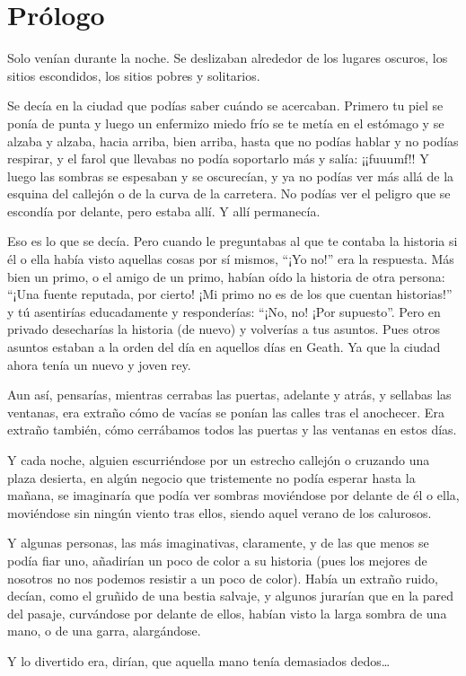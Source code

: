 \chapter*{Prólogo}

{Solo venían durante la noche. Se deslizaban alrededor de los lugares
oscuros, los sitios escondidos, los sitios pobres y solitarios.}

{Se decía en la ciudad que podías saber cuándo se acercaban. Primero tu
	piel se ponía de punta y luego un enfermizo miedo frío se te metía en el
	estómago y se alzaba y alzaba, hacia arriba, bien arriba, hasta que no
	podías hablar y no podías respirar, y el farol que llevabas no podía
	soportarlo más y salía: ¡¡fuuumf!! Y luego las sombras se espesaban y se
	oscurecían, y ya no podías ver más allá de la esquina del callejón o de
	la curva de la carretera. No podías ver el peligro que se escondía por
delante, pero estaba allí. Y allí permanecía.}

{Eso es lo que se decía. Pero cuando le preguntabas al que te contaba la
	historia si él o ella había visto aquellas cosas por sí mismos, ``¡Yo
	no!'' era la respuesta. Más bien un primo, o el amigo de un primo,
	habían oído la historia de otra persona: ``¡Una fuente reputada, por
	cierto! ¡Mi primo no es de los que cuentan historias!'' y tú asentirías
	educadamente y responderías: ``¡No, no! ¡Por supuesto''. Pero en privado
	desecharías la historia (de nuevo) y volverías a tus asuntos. Pues otros
	asuntos estaban a la orden del día en aquellos días en Geath. Ya que la
ciudad ahora tenía un nuevo y joven rey.}

{Aun así, pensarías, mientras cerrabas las puertas, adelante y atrás, y
	sellabas las ventanas, era extraño cómo de vacías se ponían las calles
	tras el anochecer. Era extraño también, cómo cerrábamos todos las
puertas y las ventanas en estos días.}

{Y cada noche, alguien escurriéndose por un estrecho callejón o cruzando
	una plaza desierta, en algún negocio que tristemente no podía esperar
	hasta la mañana, se imaginaría que podía ver sombras moviéndose por
	delante de él o ella, moviéndose sin ningún viento tras ellos, siendo
aquel verano de los calurosos.}

{Y algunas personas, las más imaginativas, claramente, y de las que
	menos se podía fiar uno, añadirían un poco de color a su historia (pues
	los mejores de nosotros no nos podemos resistir a un poco de color).
	Había un extraño ruido, decían, como el gruñido de una bestia salvaje, y
	algunos jurarían que en la pared del pasaje, curvándose por delante de
	ellos, habían visto la larga sombra de una mano, o de una garra,
alargándose.}

{Y lo divertido era, dirían, que aquella mano tenía demasiados
	dedos\ldots{}}
